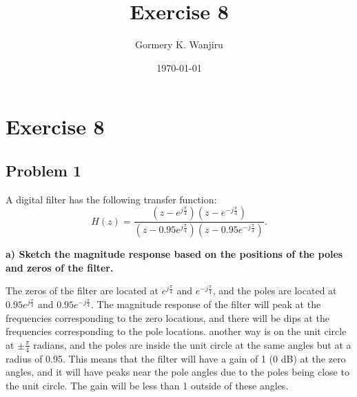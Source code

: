 \documentclass{article}
\title{Exercise 8}
\author{Gormery K. Wanjiru}
\date{\today}
\begin{document}
\maketitle


\section*{Exercise 8}

\subsection*{Problem 1}
A digital filter has the following transfer function:
\[
    H(z) = \frac{(z - e^{j\frac{\pi}{4}})(z - e^{-j\frac{\pi}{4}})}{(z - 0.95e^{j\frac{\pi}{4}})(z - 0.95e^{-j\frac{\pi}{4}})}.
\]

\textbf{a) Sketch the magnitude response based on the positions of the poles and zeros of the filter.}

The zeros of the filter are located at $e^{j\frac{\pi}{4}}$ and $e^{-j\frac{\pi}{4}}$, and the poles are located at $0.95e^{j\frac{\pi}{4}}$ and $0.95e^{-j\frac{\pi}{4}}$. The magnitude response of the filter will peak at the frequencies corresponding to the zero locations, and there will be dips at the frequencies corresponding to the pole locations.
another way is on the unit circle at \(\pm \frac{\pi}{4}\) radians, and the poles are inside the unit circle at the same angles but at a radius of 0.95. This means that the filter will have a gain of 1 (0 dB) at the zero angles, and it will have peaks near the pole angles due to the poles being close to the unit circle. The gain will be less than 1 outside of these angles.

\begin{center}
\end{center}
\end{document}
